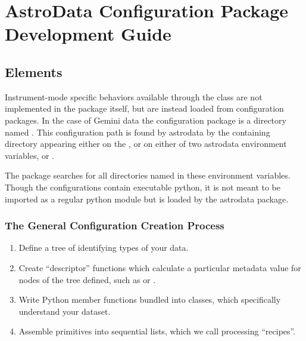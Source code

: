 \documentclass[letterpaper,10pt,english]{sphinxmanual}
\begin{document}
\chapter{AstroData Configuration Package Development Guide}
\label{developmentGuide:astrodata-configuration-package-development-guide}\label{developmentGuide::doc}

\section{Elements}
\label{configElements:elements}\label{configElements::doc}
Instrument-mode specific behaviors available through the  class
are not implemented in the  package itself, but are instead loaded from
configuration packages. In the case of Gemini data the
configuration package is a directory named .  This
configuration path is found by astrodata by the containing directory
appearing either on the , or on either of two astrodata environment
variables,  or .

The  package searches for all directories named 
in these environment variables.  Though the configurations contain
executable python, it is not meant to be imported as a regular python module but
is loaded by the astrodata package.


\subsection{The General Configuration Creation Process}
\label{configElements:the-general-configuration-creation-process}\begin{enumerate}
\item {} 
Define a tree of  identifying types of your data.

\item {} 
Create ``descriptor'' functions which calculate a particular metadata
value for nodes of the  tree defined,
such as  or .

\item {} 
Write Python member functions bundled into  classes,
which specifically understand your dataset.

\item {} 
Assemble primitives into sequential lists, which we call  processing
``recipes''.

\end{enumerate}
\end{document}
